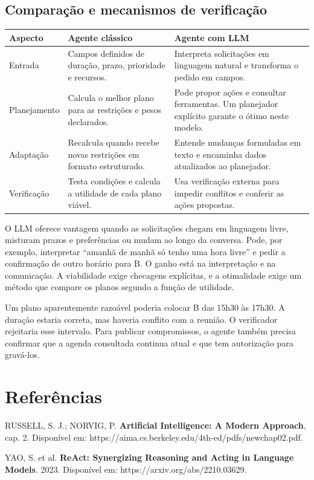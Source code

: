 \documentclass[12pt,a4paper]{article}
\begin{document}
\subsection{Comparação e mecanismos de verificação}

\begin{table}[htbp]
    \centering
    \begin{tabular}{>{\raggedright\arraybackslash}p{2.7cm} >{\raggedright\arraybackslash}p{5.8cm} >{\raggedright\arraybackslash}p{6.0cm}}
        \toprule
        \textbf{Aspecto} & \textbf{Agente clássico} & \textbf{Agente com LLM} \\
        \midrule
        Entrada & Campos definidos de duração, prazo, prioridade e recursos. & Interpreta solicitações em linguagem natural e transforma o pedido em campos. \\
        \addlinespace
        Planejamento & Calcula o melhor plano para as restrições e pesos declarados. & Pode propor ações e consultar ferramentas. Um planejador explícito garante o ótimo neste modelo. \\
        \addlinespace
        Adaptação & Recalcula quando recebe novas restrições em formato estruturado. & Entende mudanças formuladas em texto e encaminha dados atualizados ao planejador. \\
        \addlinespace
        Verificação & Testa condições e calcula a utilidade de cada plano viável. & Usa verificação externa para impedir conflitos e conferir as ações propostas. \\
        \bottomrule
    \end{tabular}
\end{table}

O LLM oferece vantagem quando as solicitações chegam em linguagem livre, misturam prazos e preferências ou mudam ao longo da conversa. Pode, por exemplo, interpretar ``amanhã de manhã só tenho uma hora livre'' e pedir a confirmação de outro horário para B. O ganho está na interpretação e na comunicação. A viabilidade exige checagens explícitas, e a otimalidade exige um método que compare os planos segundo a função de utilidade.

Um plano aparentemente razoável poderia colocar B das 15h30 às 17h30. A duração estaria correta, mas haveria conflito com a reunião. O verificador rejeitaria esse intervalo. Para publicar compromissos, o agente também precisa confirmar que a agenda consultada continua atual e que tem autorização para gravá-los.

\section*{Referências}

\noindent [1] RUSSELL, S. J.; NORVIG, P. \textbf{Artificial Intelligence: A Modern Approach}, cap. 2. Disponível em: https://aima.cs.berkeley.edu/4th-ed/pdfs/newchap02.pdf.

\noindent [2] YAO, S. et al. \textbf{ReAct: Synergizing Reasoning and Acting in Language Models}. 2023. Disponível em: https://arxiv.org/abs/2210.03629.
\end{document}
